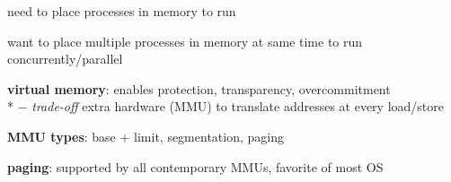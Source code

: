 \begin{summary}
  \begin{items}
    \item need to place processes in memory to run
    \item want to place multiple processes in memory at same time to run concurrently/parallel
    \item \textbf{virtual memory}: enables protection, transparency, overcommitment \\*
      $ - $ \emph{trade-off} extra hardware (MMU) to translate addresses at every load/store
    \item \textbf{MMU types}: base + limit, segmentation, paging
    \item \textbf{paging}: supported by all contemporary MMUs, favorite of most OS
  \end{items}
\end{summary}